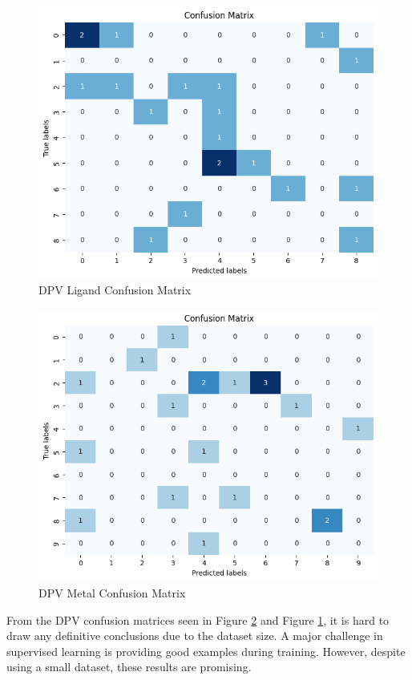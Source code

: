 \begin{figure}[h!]
  \centering
    \includegraphics[width=1.0\textwidth]{figures/dpv_ligand_matrix.png}
    \caption{DPV Ligand Confusion Matrix}
    \label{dpv_ligand_matrix}
\end{figure}
\begin{figure}[h!]
  \centering
    \includegraphics[width=1.0\textwidth]{figures/dpv_metal_matrix.png}
    \caption{DPV Metal Confusion Matrix}
    \label{dpv_metal_matrix}
\end{figure}
From the DPV confusion matrices seen in Figure \ref{dpv_metal_matrix} and Figure \ref{dpv_ligand_matrix}, it is hard to draw any definitive conclusions due to the dataset size. 
A major challenge in supervised learning is providing good examples during training. However, despite using a small dataset, these results are promising. 
